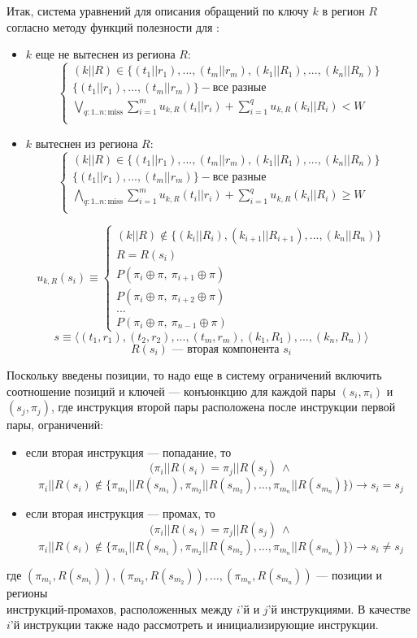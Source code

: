Итак, система уравнений для описания обращений по ключу $k$ в регион $R$
согласно методу функций полезности для \PseudoLRU:
\begin{itemize}
\item $k$ еще не вытеснен из региона $R$:
$$
\left\{\begin{array}{l}
(k||R) \in \{(t_1||r_1), ..., (t_m||r_m), (k_1||R_1), ..., (k_n||R_n)\}\\
\{(t_1||r_1), ..., (t_m||r_m)\} - \mbox{все разные}\\
\bigvee_{q:1..n:\mbox{miss}} \sum\limits_{i=1}^m u_{k,R}(t_i||r_i) +
\sum\limits_{i=1}^q u_{k,R}(k_i||R_i) < W\\
\end{array} \right.
$$
\item $k$ вытеснен из региона $R$:
$$
\left\{\begin{array}{l} (k||R) \in \{(t_1||r_1), ..., (t_m||r_m), (k_1||R_1),
..., (k_n||R_n)\}\\
\{(t_1||r_1), ..., (t_m||r_m)\} - \mbox{все разные}\\
\bigwedge_{q:1..n:\mbox{miss}} \sum\limits_{i=1}^m u_{k,R}(t_i||r_i) +
\sum\limits_{i=1}^q u_{k,R}(k_i||R_i) \geqslant W\\
\end{array} \right.
$$
\end{itemize}

$$u_{k,R} (s_i) \equiv \left\{\begin{array}{l}
(k||R) \notin \{(k_i||R_i), (k_{i+1}||R_{i+1}), ..., (k_n||R_n)\}\\
R = R(s_i)\\
P(\pi_i \oplus \pi,~\pi_{i+1} \oplus \pi)\\
P(\pi_i \oplus \pi,~\pi_{i+2} \oplus \pi)\\
... \\
P(\pi_i \oplus \pi,~\pi_{n-1} \oplus \pi)
\end{array}\right.
$$
$$s \equiv \langle (t_1,r_1), (t_2,r_2), ..., (t_m,r_m), (k_1, R_1), ...,
(k_n,R_n) \rangle$$
$$R(s_i) \mbox{~--- вторая компонента~} s_i$$

Поскольку введены позиции, то надо еще в систему ограничений включить
соотношение позиций и ключей --- конъюнкцию для каждой пары $(s_i,\pi_i)$ и
$(s_j, \pi_j)$, где инструкция второй пары расположена после инструкции первой
пары, ограничений:
\begin{itemize}
    \item если вторая инструкция --- попадание, то $$(\pi_i||R(s_i) =
\pi_j||R(s_j)~\wedge$$ $$\pi_i||R(s_i) \notin \{\pi_{m_1}||R(s_{m_1}),
\pi_{m_2}||R(s_{m_2}), \dots, \pi_{m_n}||R(s_{m_n})\}) \rightarrow s_i = s_j$$
    \item если вторая инструкция --- промах, то $$(\pi_i||R(s_i) =
\pi_j||R(s_j)~\wedge$$ $$\pi_i||R(s_i) \notin \{\pi_{m_1}||R(s_{m_1}),
\pi_{m_2}||R(s_{m_2}), \dots, \pi_{m_n}||R(s_{m_n})\}) \rightarrow s_i \neq
s_j$$
\end{itemize}
где $(\pi_{m_1},R(s_{m_1})), (\pi_{m_2},R(s_{m_2})), \dots,
(\pi_{m_n},R(s_{m_n}))$ --- позиции и регионы\\инструкций-промахов,
расположенных между $i$'й и $j$'й инструкциями. В качестве $i$'й инструкции
также надо рассмотреть и инициализирующие инструкции.

